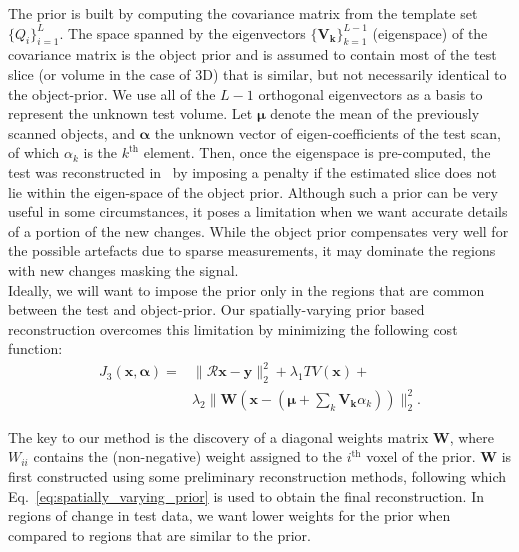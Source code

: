 \documentclass[journal]{IEEEtran}
\begin{document}
The prior is built by computing the covariance matrix from the
template set $\{Q_i\}_{i=1}^L$. The space spanned by the eigenvectors
$\{\boldsymbol{V_k}\}_{k=1}^{L-1}$ (eigenspace) of the covariance
matrix is the object prior and is assumed to contain most of the test
slice (or volume in the case of 3D) that is similar, but not
necessarily identical to the object-prior. We use all of the $L-1$
orthogonal eigenvectors as a basis to represent the unknown test
volume. Let $\boldsymbol{\mu}$ denote the mean of the previously
scanned objects, and $\boldsymbol{\alpha}$ the unknown vector of
eigen-coefficients of the test scan, of which $\alpha_k$ is the
$k^{\textrm{th}}$ element. Then, once the eigenspace is pre-computed,
the test was reconstructed in~\cite{my_dicta_paper} by imposing a
penalty if the estimated slice does not lie within the eigen-space of
the object prior. Although such a prior can be very useful in some circumstances, it poses a limitation when we want accurate details of a portion of
the new changes. While the object prior compensates very well for the
possible artefacts due to sparse measurements, it may dominate the
regions with new changes masking the signal. \\

Ideally, we will want to
impose the prior only in the regions that are common between the test
and object-prior.  Our spatially-varying prior based reconstruction
overcomes this limitation by minimizing the following cost function:
\begin{equation}
  \begin{split}
  J_3(\boldsymbol{x},\boldsymbol{\alpha}) = &\lVert\boldsymbol{\mathcal{R} x}-\boldsymbol{y}\rVert_2^2  + \lambda_1TV(\boldsymbol{x}) +\\
  &\lambda_2\lVert\boldsymbol{W}(\boldsymbol{x} - (\boldsymbol{\mu} + \sum_{k}\boldsymbol{V_k}\alpha_k))\rVert_2^2.
  \label{eq:spatially_varying_prior}
  \end{split}
\end{equation}


The key to our method is the discovery of a diagonal weights matrix
$\boldsymbol{W}$, where $W_{ii}$ contains the (non-negative) weight
assigned to the $i^{\textrm{th}}$ voxel of the prior. $\boldsymbol{W}$
is first constructed using some preliminary reconstruction methods,
following which Eq.~\ref{eq:spatially_varying_prior} is used to obtain
the final reconstruction. In regions of change in test data, we want
lower weights for the prior when compared to regions that are similar
to the prior.
\end{document}
